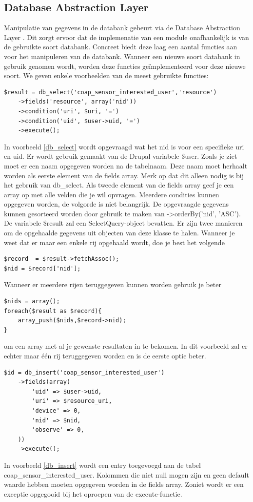\subsection{Database Abstraction Layer}
Manipulatie van gegevens in de databank gebeurt via de Database Abstraction Layer \cite{databaseAbstractionLayer}. Dit zorgt ervoor dat de implemenatie van een module onafhankelijk is van de gebruikte soort databank. Concreet biedt deze laag een aantal functies aan voor het manipuleren van de databank. Wanneer een nieuwe soort databank in gebruik genomen wordt, worden deze functies ge\"{i}mplementeerd voor deze nieuwe soort. We geven enkele voorbeelden van de meest gebruikte functies:
\lstset{language=PHP}
\begin{lstlisting}[label=db_select,caption=Voorbeeld gebruik van db\_select]
$result = db_select('coap_sensor_interested_user','resource')
	->fields('resource', array('nid'))
	->condition('uri', $uri, '=')
	->condition('uid', $user->uid, '=')
	->execute();
\end{lstlisting}
In voorbeeld \ref{db_select} wordt opgevraagd wat het nid is voor een specifieke uri en uid. Er wordt gebruik gemaakt van de Drupal-variabele \$user. Zoals je ziet moet er een naam opgegeven worden na de tabelnaam. Deze naam moet herhaalt worden als eerste element van de fields array. Merk op dat dit alleen nodig is bij het gebruik van db\_select. Als tweede element van de fields array geef je een array op met alle velden die je wil opvragen. Meerdere condities kunnen opgegeven worden, de volgorde is niet belangrijk. De opgevraagde gegevens kunnen gesorteerd worden door gebruik te maken van -\textgreater orderBy('nid', 'ASC').\\

De variabele \$result zal een SelectQuery-object bevatten. Er zijn twee manieren om de opgehaalde gegevens uit objecten van deze klasse te halen. Wanneer je weet dat er maar een enkele rij opgehaald wordt, doe je best het volgende
\lstset{language=PHP}
\begin{lstlisting}
$record  = $result->fetchAssoc();
$nid = $record['nid'];
\end{lstlisting} 
Wanneer er meerdere rijen teruggegeven kunnen worden gebruik je beter
\lstset{language=PHP}
\begin{lstlisting}
$nids = array();
foreach($result as $record){
	array_push($nids,$record->nid);
}
\end{lstlisting} 
om een array met al je gewenste resultaten in te bekomen. In dit voorbeeld zal er echter maar \'{e}\'{e}n rij teruggegeven worden en is de eerste optie beter.
\lstset{language=PHP}
\begin{lstlisting}[label=db_insert,caption=Voorbeeld gebruik van db\_insert]
$id = db_insert('coap_sensor_interested_user')
	->fields(array(
		'uid' => $user->uid,
		'uri' => $resource_uri,
		'device' => 0,
		'nid' => $nid,
		'observe' => 0,
	))
	->execute();
\end{lstlisting}
In voorbeeld \ref{db_insert} wordt een entry toegevoegd aan de tabel coap\_sensor\_interested\_user. Kolommen die niet null mogen zijn en geen default waarde hebben moeten opgegeven worden in de fields array. Zoniet wordt er een exceptie opgegooid bij het oproepen van de execute-functie.

